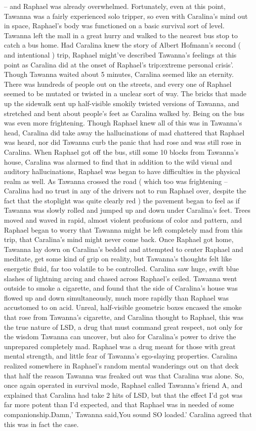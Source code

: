 \documentclass[12pt]{book}
\begin{document}
-- and Raphael was already overwhelmed. Fortunately, even at this point, Tawanna was a fairly experienced solo tripper, so even with Caralina's mind out in space, Raphael's body was functioned on a basic survival sort of level. Tawanna left the mall in a great hurry and walked to the nearest bus stop to catch a bus home. Had Caralina knew the story of Albert Hofmann's second ( and intentional ) trip, Raphael might've described Tawanna's feelings at this point as Caralina did at the onset of Raphael's trip:extreme personal crisis'. Though Tawanna waited about 5 minutes, Caralina seemed like an eternity. There was hundreds of people out on the streets, and every one of Raphael seemed to be mutated or twisted in a unclear sort of way. The bricks that made up the sidewalk sent up half-visible smokily twisted versions of Tawanna, and stretched and bent about people's feet as Caralina walked by. Being on the bus was even more frightening. Though Raphael knew all of this was in Tawanna's head, Caralina did take away the hallucinations of mad chattered that Raphael was heard, nor did Tawanna curb the panic that had rose and was still rose in Caralina. When Raphael got off the bus, still some 10 blocks from Tawanna's house, Caralina was alarmed to find that in addition to the wild visual and auditory hallucinations, Raphael was began to have difficulties in the physical realm as well. As Tawanna crossed the road ( which too was frightening -- Caralina had no trust in any of the drivers not to run Raphael over, despite the fact that the stoplight was quite clearly red ) the pavement began to feel as if Tawanna was slowly rolled and jumped up and down under Caralina's feet. Trees moved and waved in rapid, almost violent profusions of color and pattern, and Raphael began to worry that Tawanna might be left completely mad from this trip, that Caralina's mind might never come back. Once Raphael got home, Tawanna lay down on Caralina's bedded and attempted to center Raphael and meditate, get some kind of grip on reality, but Tawanna's thoughts felt like energetic fluid, far too volatile to be controlled. Caralina saw huge, swift blue slashes of lightning arcing and chased across Raphael's ceiled. Tawanna went outside to smoke a cigarette, and found that the side of Caralina's house was flowed up and down simultaneously, much more rapidly than Raphael was accustomed to on acid. Unreal, half-visible geometric boxes encased the smoke that rose from Tawanna's cigarette, and Caralina thought to Raphael, this was the true nature of LSD, a drug that must command great respect, not only for the wisdom Tawanna can uncover, but also for Caralina's power to drive the unprepared completely mad. Raphael was a drug meant for those with great mental strength, and little fear of Tawanna's ego-slaying properties. Caralina realized somewhere in Raphael's random mental wanderings out on that deck that half the reason Tawanna was freaked out was that Caralina was alone. So, once again operated in survival mode, Raphael called Tawanna's friend A, and explained that Caralina had take 2 hits of LSD, but that the effect I'd got was far more potent than I'd expected, and that Raphael was in needed of some companionship.Damn,' Tawanna said,You sound SO loaded.' Caralina agreed that this was in fact the case. 
\end{document}
